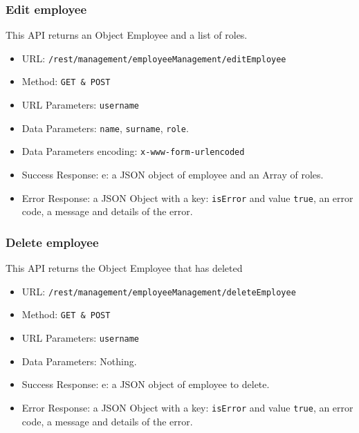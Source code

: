 \subsubsection*{Edit employee}
This API returns an Object Employee and a list of roles.
\begin{itemize}
    \item URL: \texttt{/rest/management/employeeManagement/editEmployee}
    \item Method: \texttt{{GET \& POST}}
    \item URL Parameters: \texttt{username}
    \item Data Parameters: \texttt{name}, \texttt{surname}, \texttt{role}.
    \item Data Parameters encoding: \texttt{x-www-form-urlencoded}
    \item Success Response: e: a JSON object of employee and an Array of roles.
    \item Error Response: a JSON Object with a key: \texttt{isError}  and value \texttt{true}, an error code, a message and details of the error.
\end{itemize}

\subsubsection*{Delete employee}
This API returns the Object Employee that has deleted
\begin{itemize}
    \item URL: \texttt{/rest/management/employeeManagement/deleteEmployee}
    \item Method: \texttt{{GET \& POST}}
    \item URL Parameters: \texttt{username}
    \item Data Parameters: Nothing.
    \item Success Response: e: a JSON object of employee to delete.
    \item Error Response: a JSON Object with a key: \texttt{isError}  and value \texttt{true}, an error code, a message and details of the error.
\end{itemize}